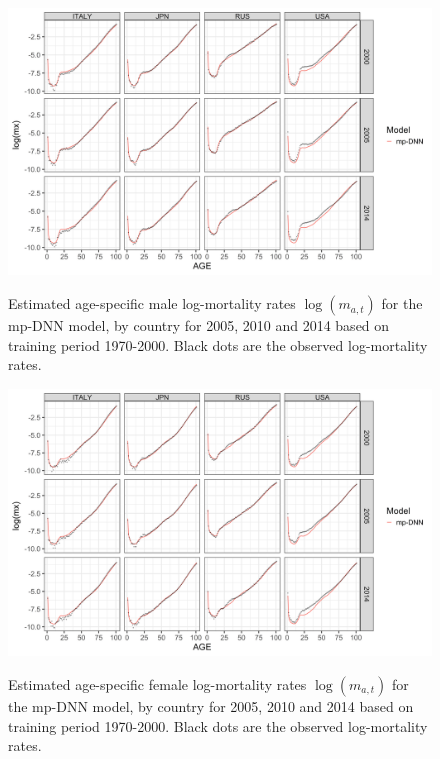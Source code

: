 \documentclass[a4,11pt]{article}
\begin{document}
\begin{figure}[H]
	\centering
	\includegraphics[width=1\linewidth]{MP_age_pattern_M_1970}\\
	 \caption{Estimated age-specific male log-mortality rates $\log(m_{a,t})$ for the mp-DNN model, by country for 2005, 2010 and 2014 based on training period 1970-2000. Black dots are the observed log-mortality rates.} 
	 \label{fig:MP.estimate.age.mx_M}
\end{figure}

\begin{figure}[H]
	\centering
	\includegraphics[width=1\linewidth]{MP_age_pattern_F_1970}\\
	 \caption{Estimated age-specific female log-mortality rates $\log(m_{a,t})$ for the mp-DNN model, by country for 2005, 2010 and 2014 based on training period 1970-2000. Black dots are the observed log-mortality rates.} 
	 \label{fig:MP.estimate.age.mx_F}
\end{figure}
\end{document}
